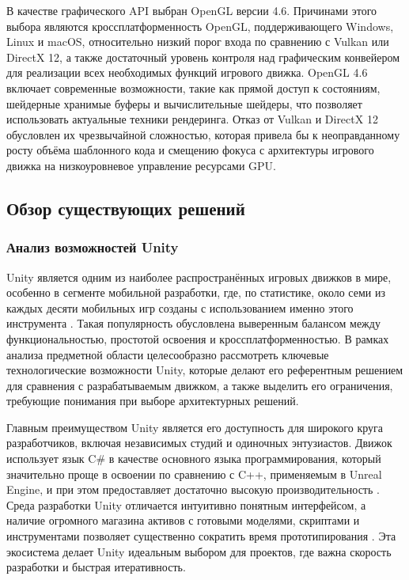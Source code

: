 В качестве графического API выбран OpenGL версии 4.6. Причинами этого выбора являются кроссплатформенность OpenGL, поддерживающего Windows, Linux и macOS, относительно низкий порог входа по сравнению с Vulkan или DirectX 12, а также достаточный уровень контроля над графическим конвейером для реализации всех необходимых функций игрового движка. OpenGL 4.6 включает современные возможности, такие как прямой доступ к состояниям, шейдерные хранимые буферы и вычислительные шейдеры, что позволяет использовать актуальные техники рендеринга. Отказ от Vulkan и DirectX 12 обусловлен их чрезвычайной сложностью, которая привела бы к неоправданному росту объёма шаблонного кода и смещению фокуса с архитектуры игрового движка на низкоуровневое управление ресурсами GPU.

\subsection{Обзор существующих решений}
\subsubsection{Анализ возможностей Unity}
Unity является одним из наиболее распространённых игровых движков в мире, особенно в сегменте мобильной разработки, где, по статистике, около семи из каждых десяти мобильных игр созданы с использованием именно этого инструмента . Такая популярность обусловлена выверенным балансом между функциональностью, простотой освоения и кроссплатформенностью. В рамках анализа предметной области целесообразно рассмотреть ключевые технологические возможности Unity, которые делают его референтным решением для сравнения с разрабатываемым движком, а также выделить его ограничения, требующие понимания при выборе архитектурных решений.

Главным преимуществом Unity является его доступность для широкого круга разработчиков, включая независимых студий и одиночных энтузиастов. Движок использует язык C\# в качестве основного языка программирования, который значительно проще в освоении по сравнению с C++, применяемым в Unreal Engine, и при этом предоставляет достаточно высокую производительность . Среда разработки Unity отличается интуитивно понятным интерфейсом, а наличие огромного магазина активов с готовыми моделями, скриптами и инструментами позволяет существенно сократить время прототипирования . Эта экосистема делает Unity идеальным выбором для проектов, где важна скорость разработки и быстрая итеративность.

